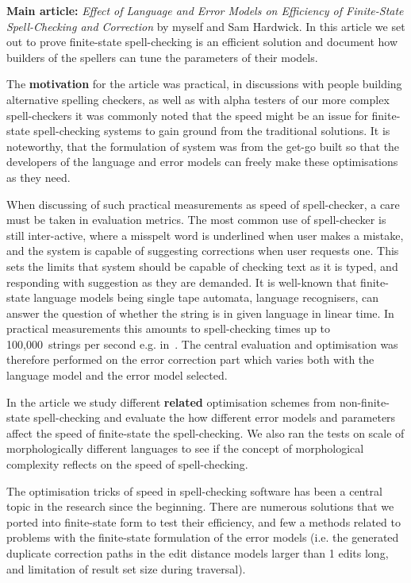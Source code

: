 \documentclass[officiallayout,draft]{unihelcompling}
\begin{document}
\textbf{Main article:} \emph{Effect of Language and Error Models on Efficiency
of Finite-State Spell-Checking and Correction} by myself and Sam Hardwick. In
this article we set out to prove finite-state spell-checking is an efficient
solution and document how builders of the spellers can tune the parameters
of their models.

The \textbf{motivation} for the article was practical, in discussions with
people building alternative spelling checkers, as well as with alpha testers of
our more complex spell-checkers it was commonly noted that the speed might be
an issue for finite-state spell-checking systems to gain ground from the
traditional solutions. It is noteworthy, that the formulation of system was
from the get-go built so that the developers of the language and error models
can freely make these optimisations as they need.

When discussing of such practical measurements as speed of spell-checker, a
care must be taken in evaluation metrics. The most common use of spell-checker
is still inter-active, where a misspelt word is underlined when user makes a
mistake, and the system is capable of suggesting corrections when user requests
one. This sets the limits that system should be capable of checking text as it
is typed, and responding with suggestion as they are demanded. It is well-known
that finite-state language models being single tape automata, language
recognisers, can answer the question of whether the string is in given language
in linear time. In practical measurements this amounts to spell-checking times
up to 100,000~strings per second e.g. in~\citet{silfverberg2009hfst}. The
central evaluation and optimisation was therefore performed on the error
correction part which varies both with the language model and the error model
selected.

In the article we study different \textbf{related} optimisation schemes from
non-finite-state spell-checking and evaluate the how different error models and
parameters affect the speed of finite-state the spell-checking. We also ran the
tests on scale of morphologically different languages to see if the concept of
morphological complexity reflects on the speed of spell-checking.

The optimisation tricks of speed in spell-checking software has been a central
topic in the research since the beginning. There are numerous solutions that we
ported into finite-state form to test their efficiency, and few a methods
related to problems with the finite-state formulation of the error models (i.e.
the generated duplicate correction paths in the edit distance models larger
than 1 edits long, and limitation of result set size during traversal).
\end{document}
